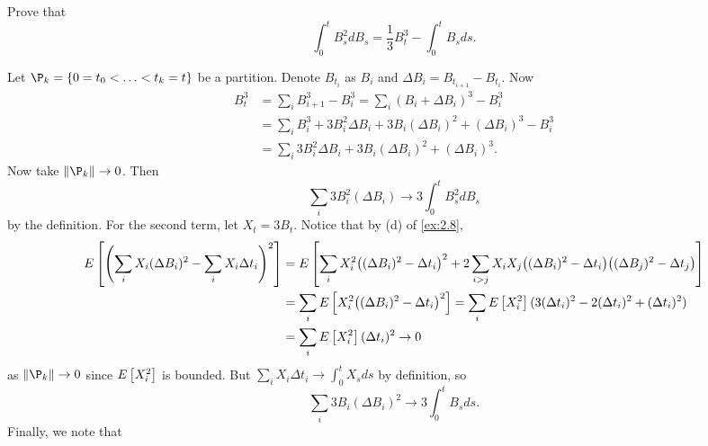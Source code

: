 \begin{exercise}{3.2}\label{ex:3.2}
    Prove that 
    \begin{equation*}
        \int_0^t B_s^2dB_s = \frac{1}{3}B_t^3 - \int_0^t B_sds. 
    \end{equation*}
\end{exercise}
\begin{solution}
    Let $\P_k = \set{0 = t_0 < \ldots < t_k = t}$ be a partition. Denote $B_{t_i}$ as 
    $B_i$ and $\Delta B_i = B_{t_{i+1}} - B_{t_i}$. Now 
    \begin{equation*}
        \begin{split}
            B_t^3 &= \sum_i B_{i+1}^3 - B_i^3 = \sum_i (B_i + \Delta B_i)^3 - B_i^3 \\ 
            &= \sum_i B_i^3 + 3B_i^2\Delta B_i + 3B_i(\Delta B_i)^2 + (\Delta B_i)^3 - B_i^3 \\ 
            &= \sum_i 3B_i^2\Delta B_i + 3B_i(\Delta B_i)^2 + (\Delta B_i)^3. 
        \end{split}
    \end{equation*}
    Now take $\norm{\P_k}\to 0$. Then 
    \begin{equation*}
        \sum_i 3B_i^2(\Delta B_i) \to 3\int_0^t B_s^2dB_s
    \end{equation*}
    by the definition. For the second term, let $X_t = 3B_t$. Notice that by (d) of \cref{ex:2.8}, 
    \begin{equation*}
        \begin{split}
            E\sbrc{\pth{\sum_i X_i(\Delta B_i)^2 - \sum_i X_i\Delta t_i}^2} 
            &= E\sbrc{\sum_i X_i^2\pth{(\Delta B_i)^2 - \Delta t_i}^2 + 2\sum_{i>j} X_iX_j\pth{(\Delta B_i)^2 - \Delta t_i}\pth{(\Delta B_j)^2 - \Delta t_j}} \\
            &= \sum_i E\sbrc{X_i^2\pth{(\Delta B_i)^2 - \Delta t_i}^2} 
            = \sum_i E\sbrc{X_i^2}(3(\Delta t_i)^2 - 2(\Delta t_i)^2 + (\Delta t_i)^2) \\
            &= \sum_i E\sbrc{X_i^2}(\Delta t_i)^2 \to 0
        \end{split}
    \end{equation*}
    as $\norm{\P_k}\to 0$ since $E\left[ {X_i^2} \right]$ is bounded. But $\sum_i X_i\Delta t_i \to \int_0^t X_sds$ 
    by definition, so 
    \begin{equation*}
        \sum_i 3B_i(\Delta B_i)^2 \to 3\int_0^t B_sds. 
    \end{equation*}
    Finally, we note that 
    \begin{equation*}

\end{equation*}
\end{solution}
